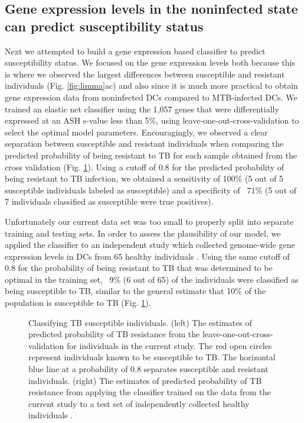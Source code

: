 \documentclass[fleqn,10pt]{wlscirep}
\begin{document}
\subsection*{Gene expression levels in the noninfected state can predict susceptibility status}

Next we attempted to build a gene expression based classifier to predict susceptibility status. We focused on the gene expression levels both because this is where we observed the largest differences between susceptible and resistant individuals (Fig. \ref{fig:limma}ac) and also since it is much more practical to obtain gene expression data from noninfected DCs compared to MTB-infected DCs. We trained an elastic net classifier using the 1,057 genes that were differentially expressed at an ASH s-value \cite{Stephens2016} less than 5\%, using leave-one-out-cross-validation to select the optimal model parameters. Encouragingly, we observed a clear separation between susceptible and resistant individuals when comparing the predicted probability of being resistant to TB for each sample obtained from the cross validation (Fig. \ref{fig:classifier}). Using a cutoff of 0.8 for the predicted probability of being resistant to TB infection, we obtained a sensitivity of 100\% (5 out of 5 susceptible individuals labeled as susceptible) and a specificity of ~71\% (5 out of 7 individuals classified as susceptible were true positives).

Unfortunately our current data set was too small to properly split into separate training and testing sets. In order to assess the plausibility of our model, we applied the classifier to an independent study which collected genome-wide gene expression levels in DCs from 65 healthy individuals \cite{Barreiro2012}. Using the same cutoff of 0.8 for the probability of being resistant to TB that was determined to be optimal in the training set, ~9\% (6 out of 65) of the individuals were classified as being susceptible to TB, similar to the general estimate that 10\% of the population is susceptible to TB (Fig. \ref{fig:classifier}).

\begin{figure}[ht]
\centering
\caption{
Classifying TB susceptible individuals. (left) The  estimates of predicted probability of TB resistance from the leave-one-out-cross-validation for individuals in the current study. The red open circles represent individuals known to be susceptible to TB. The horizontal blue line at a probability of 0.8 separates susceptible and resistant individuals. (right) The estimates of predicted probability of TB resistance from applying the classifier trained on the data from the current study to a test set of independently collected healthy individuals \cite{Barreiro2012}.
}
\label{fig:classifier}
\end{figure}
\end{document}
